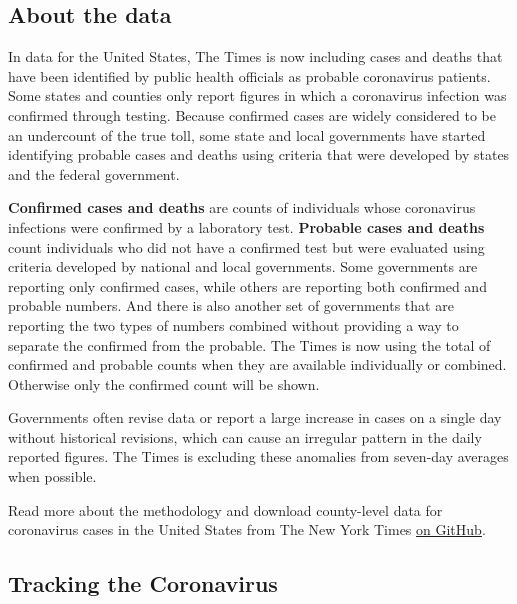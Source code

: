 \hypertarget{about-the-data}{%
\subsection{About the data}\label{about-the-data}}

In data for the United States, The Times is now including cases and
deaths that have been identified by public health officials as probable
coronavirus patients. Some states and counties only report figures in
which a coronavirus infection was confirmed through testing. Because
confirmed cases are widely considered to be an undercount of the true
toll, some state and local governments have started identifying probable
cases and deaths using criteria that were developed by states and the
federal government.

\textbf{Confirmed cases and deaths} are counts of individuals whose
coronavirus infections were confirmed by a laboratory test.
\textbf{Probable cases and deaths} count individuals who did not have a
confirmed test but were evaluated using criteria developed by national
and local governments. Some governments are reporting only confirmed
cases, while others are reporting both confirmed and probable numbers.
And there is also another set of governments that are reporting the two
types of numbers combined without providing a way to separate the
confirmed from the probable. The Times is now using the total of
confirmed and probable counts when they are available individually or
combined. Otherwise only the confirmed count will be shown.

Governments often revise data or report a large increase in cases on a
single day without historical revisions, which can cause an irregular
pattern in the daily reported figures. The Times is excluding these
anomalies from seven-day averages when possible.

Read more about the methodology and download county-level data for
coronavirus cases in the United States from The New York Times
\href{https://github.com/nytimes/covid-19-data}{on GitHub}.

\hypertarget{tracking-the-coronavirus}{%
\subsection{Tracking the Coronavirus}\label{tracking-the-coronavirus}}

